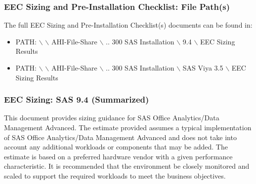 \subsubsection{EEC Sizing and Pre-Installation Checklist: File Path(s)}

The full EEC Sizing and Pre-Installation Checklist(s) documents can be found in:
\begin{itemize}
    \item PATH: $\backslash$ $\backslash$ AHI-File-Share $\backslash$ .. 300 SAS Installation $\backslash$ 9.4 $\backslash$ EEC Sizing Results
    \item PATH: $\backslash$ $\backslash$ AHI-File-Share $\backslash$ .. 300 SAS Installation $\backslash$ SAS Viya 3.5 $\backslash$ EEC Sizing Results
\end{itemize}

\subsubsection{EEC Sizing: SAS 9.4 (Summarized)}
This document provides sizing guidance for SAS Office Analytics/Data Management Advanced. The estimate provided assumes a typical implementation of SAS Office Analytics/Data Management Advanced and does not take into account any additional workloads or components that may be added. The estimate is based on a preferred hardware vendor with a given performance characteristic. It is recommended that the environment be closely monitored and scaled to support the required workloads to meet the business objectives.

